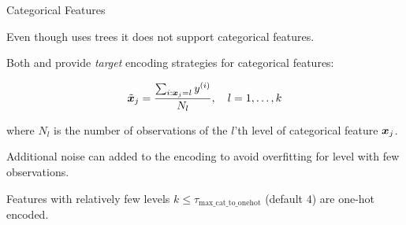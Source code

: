 \begin{vbframe}{Categorical Features}

Even though  uses trees it does not support categorical features.

\lz

Both  and  provide \emph{target} encoding strategies for categorical features:

$$
  \tilde {\bm{x}}_j = \frac{\sum_{i:\bm{x}_j=l}y^{(i)}}{N_l}, \quad l=1,\dots,k
$$

where $N_l$ is the number of observations of the $l$'th level of categorical feature $\bm{x}_j$.

\lz

Additional noise can added to the encoding to avoid overfitting for level with few observations.

\lz

Features with relatively few levels $k \le \tau_\text{max\_cat\_to\_onehot}$ (default $4$) are one-hot encoded.

\end{vbframe}


